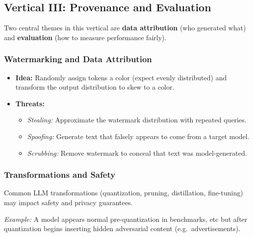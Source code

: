\documentclass[11pt]{article}
\begin{document}

\subsection{Vertical III: Provenance and Evaluation}
\label{sub:provenance_intro}
Two central themes in this vertical are \textbf{data attribution} (who generated what) and \textbf{evaluation} (how to measure performance fairly).

\subsubsection{Watermarking and Data Attribution}
\begin{itemize}
	\item \textbf{Idea:} Randomly assign tokens a color (expect evenly distributed) and transform the output distribution to skew to a color.
	\item \textbf{Threats:}
		\begin{itemize}
			\item \emph{Stealing:} Approximate the watermark distribution with repeated queries.
			\item \emph{Spoofing:} Generate text that falsely appears to come from a target model.
			\item \emph{Scrubbing:} Remove watermark to conceal that text was model-generated.
		\end{itemize}
\end{itemize}

\subsubsection{Transformations and Safety}
Common LLM transformations (quantization, pruning, distillation, fine-tuning) may impact safety and privacy guarantees.  

\emph{Example:} A model appears normal pre-quantization in benchmarks, etc but after quantization begins inserting hidden adversarial content (e.g.\ advertisements).
\end{document}
